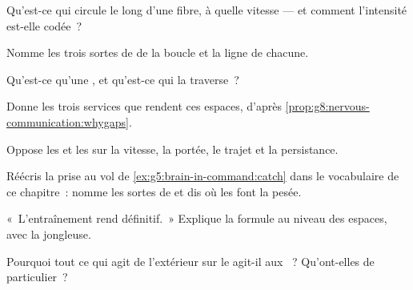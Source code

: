 \begin{exercise}[$\star$]\label{exo:g8:nervous-communication:2}
Qu'est-ce qui circule le long d'une fibre, à quelle vitesse --- et
comment l'intensité est-elle codée~?
\end{exercise}

\begin{exercise}[$\star$]\label{exo:g8:nervous-communication:3}
Nomme les trois sortes de  de la boucle et la ligne de
chacune.
\end{exercise}

\begin{exercise}[$\star$]\label{exo:g8:nervous-communication:4}
Qu'est-ce qu'une , et qu'est-ce qui la traverse~?
\end{exercise}

\begin{exercise}[$\star$]\label{exo:g8:nervous-communication:5}
Donne les trois services que rendent ces espaces, d'après
\cref{prop:g8:nervous-communication:whygaps}.
\end{exercise}

\begin{exercise}[$\star$]\label{exo:g8:nervous-communication:6}
Oppose les  et les  sur la vitesse, la portée, le
trajet et la persistance.
\end{exercise}

\begin{exercise}[$\star\star$]\label{exo:g8:nervous-communication:7}
Réécris la prise au vol de
\cref{ex:g5:brain-in-command:catch} dans le vocabulaire de ce
chapitre~: nomme les sortes de  et dis où les  font
la pesée.
\end{exercise}

\begin{exercise}[$\star\star$]\label{exo:g8:nervous-communication:8}
«~L'entraînement rend définitif.~» Explique la formule au niveau des
espaces, avec la jongleuse.
\end{exercise}

\begin{exercise}[$\star\star$]\label{exo:g8:nervous-communication:9}
Pourquoi tout ce qui agit de l'extérieur sur le 
agit-il aux ~? Qu'ont-elles de particulier~?
\end{exercise}

